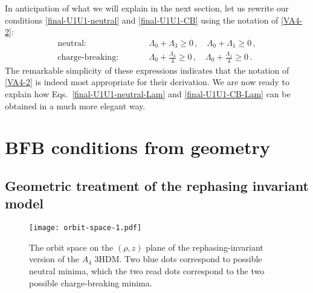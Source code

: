 \documentclass[11pt]{article}
\begin{document}
In anticipation of what we will explain in the next section,
let us rewrite our conditions \eqref{final-U1U1-neutral} and \eqref{final-U1U1-CB} 
using the notation of \eqref{VA4-2}:
\begin{eqnarray}
\mbox{neutral:}&\qquad& \Lambda_0 + \Lambda_3 \ge 0\,, \quad
\Lambda_0 + \Lambda_1 \ge 0\,, \label{final-U1U1-neutral-Lam}\\
\mbox{charge-breaking:}&\qquad& \Lambda_0 + \frac{\Lambda_3}{4} \ge 0\,, \quad
\Lambda_0 + \frac{\Lambda_1}{4} \ge 0\,.\label{final-U1U1-CB-Lam}
\end{eqnarray}
The remarkable simplicity of these expressions indicates that the notation of \eqref{VA4-2} is indeed
most appropriate for their derivation. We are now ready to explain 
how Eqs.~\eqref{final-U1U1-neutral-Lam} and \eqref{final-U1U1-CB-Lam} can be obtained in a much more elegant way.

\section{BFB conditions from geometry}\label{section-U1U1}

\subsection{Geometric treatment of the rephasing invariant model}


\begin{figure} [ht]
	\begin{center}
		\texttt{[image: orbit-space-1.pdf]}
		\caption{The orbit space on the $(\rho,z)$ plane of the rephasing-invariant version of the $A_4$ 3HDM.
		Two blue dots correspond to possible neutral minima, which the two read dots correspond to the two possible charge-breaking minima.}
		\label{fig-rho-z}
	\end{center}
\end{figure}
\end{document}
